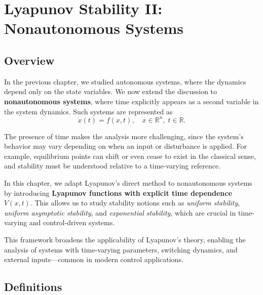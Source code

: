 \chapterspaceabove{6.75cm} %
\chapterspacebelow{7.25cm} %

\chapter{Lyapunov Stability II: Nonautonomous Systems}

\section{Overview}
In the previous chapter, we studied autonomous systems, where the dynamics depend only on the state variables. We now extend the discussion to \textbf{nonautonomous systems}, where time explicitly appears as a second variable in the system dynamics. Such systems are represented as
\[
\dot{x}(t) = f(x,t), \quad x \in \mathbb{R}^n, \; t \in \mathbb{R}.
\]

The presence of time makes the analysis more challenging, since the system’s behavior may vary depending on when an input or disturbance is applied. For example, equilibrium points can shift or even cease to exist in the classical sense, and stability must be understood relative to a time-varying reference.

In this chapter, we adapt Lyapunov’s direct method to nonautonomous systems by introducing \textbf{Lyapunov functions with explicit time dependence} \( V(x,t) \). This allows us to study stability notions such as \textit{uniform stability}, \textit{uniform asymptotic stability}, and \textit{exponential stability}, which are crucial in time-varying and control-driven systems.

This framework broadens the applicability of Lyapunov’s theory, enabling the analysis of systems with time-varying parameters, switching dynamics, and external inputs---common in modern control applications.

\section{Definitions}

